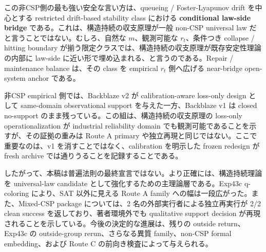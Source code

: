 \documentclass[12pt,a4paper]{article}
\begin{document}
この非CSP側の最も強い安全な言い方は、queueing / Foster-Lyapunov drift を中心とする restricted drift-based stability class における \textbf{conditional law-side bridge} である。これは、構造持続の収支原理が一般 non-CSP universal law だと言うことではない。むしろ、自然な \(m\)、観測可能な \(r_{t}\)、条件つき collapse / hitting boundary が揃う限定クラスでは、構造持続の収支原理が既存安定性理論の内部に law-side に近い形で埋め込まれる、と言うのである。Repair / maintenance balance は、その class を empirical \(r_{t}\) 側へ広げる near-bridge open-system anchor である。

非CSP empirical 側では、Backblaze v2 が calibration-aware loss-only design として same-domain observational support を与えた一方、Backblaze v1 は closed no-support のまま残っている。この組は、構造持続の収支原理の loss-only operationalization が industrial reliability domain でも観測可能であることを示すが、その証拠の重みは Route A primary や独立再現と同じではない。ここで重要なのは、v1 を消すことではなく、calibration を明示した frozen redesign が fresh archive では通りうることを記録することである。

したがって、本稿は普遍法則の最終宣言ではない。より正確には、構造持続理論を universal-law candidate として強化するための主理論層である。Exp43c q-coloring により、SAT 以外に見える Route A family への幅は一段広がった。また、Mixed-CSP package については、2 名の外部実行者による独立再実行が 2/2 clean success を返しており、著者環境外でも qualitative support decision が再現されることを示している。今後の決定的な進展は、残りの outside return、Exp43c の outside-group rerun、さらなる異質 family、non-CSP formal embedding、および Route C の前向き検査によって与えられる。
\end{document}
